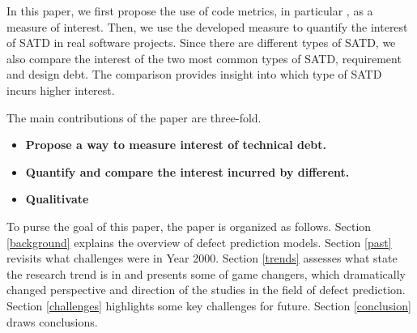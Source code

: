 In this paper, we first propose the use of code metrics, in particular , as a measure of interest. Then, we use the developed measure to quantify the interest of SATD in real software projects. Since there are different types of SATD, we also compare the interest of the two most common types of SATD, requirement and design debt. The comparison provides insight into which type of SATD incurs higher interest.
 
The main contributions of the paper are three-fold.

\begin{itemize}
\item \textbf{Propose a way to measure interest of technical debt.} 
\item  \textbf{Quantify and compare the interest incurred by different.} 
\item  \textbf{Qualitivate} 
\end{itemize}

 To purse the goal of this paper, the paper is organized as follows. 
Section \ref{background} explains the overview of defect prediction models.
Section \ref{past} revisits what challenges were in Year 2000.
Section \ref{trends} assesses what state the research trend is in and presents some of game changers, which dramatically changed perspective and direction of the studies in the field of defect prediction.
Section \ref{challenges} highlights some key challenges for future.
Section \ref{conclusion} draws conclusions.

